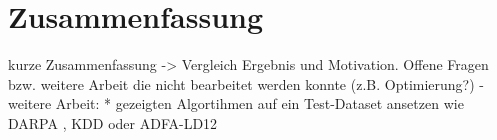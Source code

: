 \chapter{Zusammenfassung}
kurze Zusammenfassung -> Vergleich Ergebnis und Motivation. Offene Fragen bzw. weitere Arbeit die nicht bearbeitet werden konnte (z.B. Optimierung?)
-weitere Arbeit:
	* gezeigten Algortihmen auf ein Test-Dataset ansetzen wie DARPA \cite{darpa99},  KDD \cite{kdd99} oder ADFA-LD12 \cite{adfald}